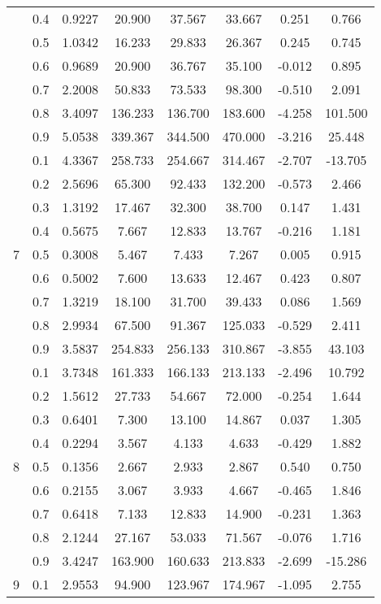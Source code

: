 \documentclass[11pt,a4paper]{report}
\begin{document}
\begin{longtable}{ | c | c || c | c | c | c | c | c | }
 & 0.4 & 0.9227 & 20.900 & 37.567 & 33.667 & 0.251 & 0.766 \\
 & 0.5 & 1.0342 & 16.233 & 29.833 & 26.367 & 0.245 & 0.745 \\
 & 0.6 & 0.9689 & 20.900 & 36.767 & 35.100 & -0.012 & 0.895 \\
 & 0.7 & 2.2008 & 50.833 & 73.533 & 98.300 & -0.510 & 2.091 \\
 & 0.8 & 3.4097 & 136.233 & 136.700 & 183.600 & -4.258 & 101.500 \\
 & 0.9 & 5.0538 & 339.367 & 344.500 & 470.000 & -3.216 & 25.448 \\
 \hline
\multirow{9}{*}{7} & 0.1 & 4.3367 & 258.733 & 254.667 & 314.467 & -2.707 & -13.705 \\
 & 0.2 & 2.5696 & 65.300 & 92.433 & 132.200 & -0.573 & 2.466 \\
 & 0.3 & 1.3192 & 17.467 & 32.300 & 38.700 & 0.147 & 1.431 \\
 & 0.4 & 0.5675 & 7.667 & 12.833 & 13.767 & -0.216 & 1.181 \\
 & 0.5 & 0.3008 & 5.467 & 7.433 & 7.267 & 0.005 & 0.915 \\
 & 0.6 & 0.5002 & 7.600 & 13.633 & 12.467 & 0.423 & 0.807 \\
 & 0.7 & 1.3219 & 18.100 & 31.700 & 39.433 & 0.086 & 1.569 \\
 & 0.8 & 2.9934 & 67.500 & 91.367 & 125.033 & -0.529 & 2.411 \\
 & 0.9 & 3.5837 & 254.833 & 256.133 & 310.867 & -3.855 & 43.103 \\
 \hline
\multirow{9}{*}{8} & 0.1 & 3.7348 & 161.333 & 166.133 & 213.133 & -2.496 & 10.792 \\
 & 0.2 & 1.5612 & 27.733 & 54.667 & 72.000 & -0.254 & 1.644 \\
 & 0.3 & 0.6401 & 7.300 & 13.100 & 14.867 & 0.037 & 1.305 \\
 & 0.4 & 0.2294 & 3.567 & 4.133 & 4.633 & -0.429 & 1.882 \\
 & 0.5 & 0.1356 & 2.667 & 2.933 & 2.867 & 0.540 & 0.750 \\
 & 0.6 & 0.2155 & 3.067 & 3.933 & 4.667 & -0.465 & 1.846 \\
 & 0.7 & 0.6418 & 7.133 & 12.833 & 14.900 & -0.231 & 1.363 \\
 & 0.8 & 2.1244 & 27.167 & 53.033 & 71.567 & -0.076 & 1.716 \\
 & 0.9 & 3.4247 & 163.900 & 160.633 & 213.833 & -2.699 & -15.286 \\
 \hline
\multirow{9}{*}{9} & 0.1 & 2.9553 & 94.900 & 123.967 & 174.967 & -1.095 & 2.755 \\

\end{longtable}
\end{document}
